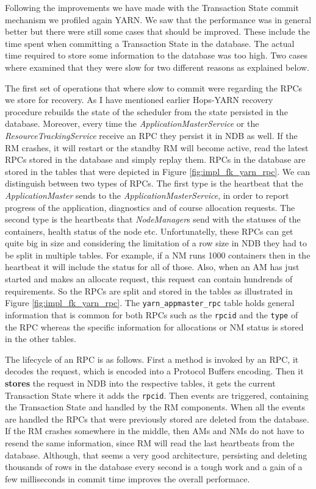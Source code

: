 Following the improvements we have made with the Transaction State
commit mechanism we profiled again YARN. We saw that the performance
was in general better but there were still some cases that should be
improved. These include the time spent when committing a Transaction
State in the database. The actual time required to store some
information to the database was too high. Two cases where examined that
they were slow for two different reasons as explained below.

The first set of operations that where slow to commit were regarding
the RPCs we store for recovery. As I have mentioned earlier Hops-YARN
recovery procedure rebuilds the state of the scheduler from the state
persisted in the database. Moreover, every time the
\emph{ApplicationMasterService} or the \emph{ResourceTrackingService}
receive an RPC they persist it in NDB as well. If the RM crashes, it
will restart or the standby RM will become active, read the latest
RPCs stored in the database and simply replay them. RPCs in the
database are stored in the tables that were depicted in Figure
\ref{fig:impl_fk_yarn_rpc}. We can distinguish between two types of
RPCs. The first type is the heartbeat that the
\emph{ApplicationMaster} sends to the \emph{ApplicationMasterService},
in order to report progress of the application, diagnostics and of
course allocation requests. The second type is the heartbeats that
\emph{NodeManager}s send with the statuses of the containers, health
status of the node etc. Unfortunatelly, these RPCs can get quite big
in size and considering the limitation of a row size in NDB they had
to be split in multiple tables. For example, if a NM runs 1000
containers then in the heartbeat it will include the status for all of
those. Also, when an AM has just started and makes an allocate
request, this request can contain hundrends of requirements. So the
RPCs are split and stored in the tables as illustrated in Figure
\ref{fig:impl_fk_yarn_rpc}. The \texttt{yarn\_appmaster\_rpc} table
holds general information that is common for both RPCs such as the
\texttt{rpcid} and the \texttt{type} of the RPC whereas the
specific information for allocations or NM status is stored in the
other tables.

The lifecycle of an RPC is as follows. First a method is invoked by
an RPC, it decodes the request, which is encoded into a Protocol
Buffers encoding. Then it \textbf{stores} the request in NDB into the
respective tables, it gets the current Transaction State where it adds
the \texttt{rpcid}. Then events are triggered, containing the
Transaction State and handled by the RM components. When all the
events are handled the RPCs that were previously stored are deleted
from the database. If the RM crashes somewhere in the middle, then AMs
and NMs do not have to resend the same information, since RM will read
the last heartbeats from the database. Although, that seems a very
good architecture, persisting and deleting thousands of rows in the
database every second is a tough work and a gain of a few milliseconds
in commit time improves the overall performace.

